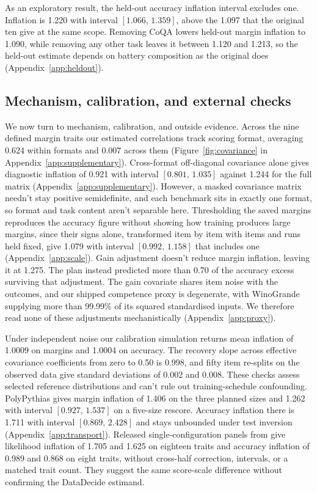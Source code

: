 \documentclass{article}
\newcommand{\ci}[2]{\ensuremath{[#1,\,#2]}}
\begin{document}
As an exploratory result, the held-out accuracy inflation interval excludes one. Inflation is 1.220 with interval \ci{1.066}{1.359}, above the 1.097 that the original ten give at the same scope. Removing CoQA lowers held-out margin inflation to 1.090, while removing any other task leaves it between 1.120 and 1.213, so the held-out estimate depends on battery composition as the original does (Appendix~\ref{app:heldout}).

\subsection{Mechanism, calibration, and external checks}
We now turn to mechanism, calibration, and outside evidence. Across the nine defined margin traits our estimated correlations track scoring format, averaging 0.624 within formats and 0.007 across them (Figure~\ref{fig:covariance} in Appendix~\ref{app:supplementary}). Cross-format off-diagonal covariance alone gives diagnostic inflation of 0.921 with interval \ci{0.801}{1.035} against 1.244 for the full matrix (Appendix~\ref{app:supplementary}). However, a masked covariance matrix needn't stay positive semidefinite, and each benchmark sits in exactly one format, so format and task content aren't separable here. Thresholding the saved margins reproduces the accuracy figure without showing how training produces large margins, since their signs alone, transformed item by item with items and runs held fixed, give 1.079 with interval \ci{0.992}{1.158} that includes one (Appendix~\ref{app:scale}). Gain adjustment doesn't reduce margin inflation, leaving it at 1.275. The plan instead predicted more than 0.70 of the accuracy excess surviving that adjustment. The gain covariate shares item noise with the outcomes, and our shipped competence proxy is degenerate, with WinoGrande supplying more than 99.99\% of its squared standardised inputs. We therefore read none of these adjustments mechanistically (Appendix~\ref{app:proxy}).

Under independent noise our calibration simulation returns mean inflation of 1.0009 on margins and 1.0004 on accuracy. The recovery slope across effective covariance coefficients from zero to 0.50 is 0.998, and fifty item re-splits on the observed data give standard deviations of 0.002 and 0.008. These checks assess selected reference distributions and can't rule out training-schedule confounding. PolyPythias gives margin inflation of 1.406 on the three planned sizes and 1.262 with interval \ci{0.927}{1.537} on a five-size rescore. Accuracy inflation there is 1.711 with interval \ci{0.869}{2.428} and stays unbounded under test inversion (Appendix~\ref{app:transport}). Released single-configuration panels from \citet{heineman2025} give likelihood inflation of 1.705 and 1.625 on eighteen traits and accuracy inflation of 0.989 and 0.868 on eight traits, without cross-half correction, intervals, or a matched trait count. They suggest the same score-scale difference without confirming the DataDecide estimand.
\end{document}
